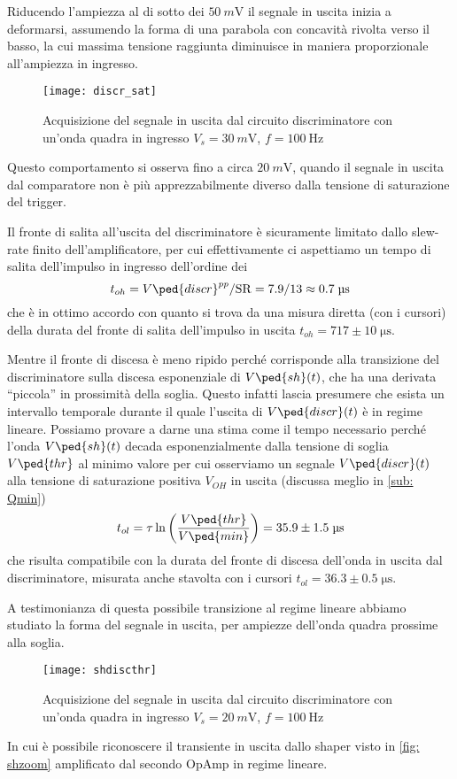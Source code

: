 \documentclass[10pt, a4paper, italian]{article}
\begin{document}
Riducendo l'ampiezza al di sotto dei $\SI{50}{m\V}$ il segnale in uscita
inizia a deformarsi, assumendo la forma di una parabola con concavità rivolta
verso il basso, la cui massima tensione raggiunta diminuisce in maniera
proporzionale all'ampiezza in ingresso.
\begin{figure}[htbp]
	\centering
	\texttt{[image: discr\_sat]}
	\caption{Acquisizione del segnale in uscita dal circuito discriminatore con
	un'onda quadra in ingresso $V_s = \SI{30}{m\V}$, $f = \SI{100}{\Hz}$
	\label{fig: discr_sat}}
\end{figure}

Questo comportamento si osserva fino a circa $\SI{20}{m\V}$, quando il segnale
in uscita dal comparatore non è più apprezzabilmente diverso dalla tensione di
saturazione del trigger.

Il fronte di salita all'uscita del discriminatore è sicuramente limitato dallo
slew-rate finito dell'amplificatore, per cui effettivamente ci aspettiamo
un tempo di salita dell'impulso in ingresso dell'ordine dei
\[
t_{oh} = V\ped{discr}^{pp}/\mathrm{SR} = 7.9 / 13 \approx 0.7 \; \si{\micro\s}
\]
che è in ottimo accordo con quanto si trova da una misura diretta (con i
cursori) della durata del fronte di salita dell'impulso in uscita
$t_{oh} = 717 \pm 10 \; \si{\micro\s}$.

Mentre il fronte di discesa è meno ripido perché corrisponde alla transizione
del discriminatore sulla discesa esponenziale di $V\ped{sh} (t)$, che ha una
derivata ``piccola'' in prossimità della soglia. Questo infatti lascia
presumere che esista un intervallo temporale durante il quale l'uscita di
$V\ped{discr} (t)$ è in regime lineare. Possiamo provare a darne una stima
come il tempo necessario perché l'onda $V\ped{sh} (t)$ decada esponenzialmente
dalla tensione di soglia $V\ped{thr}$ al minimo valore per cui osserviamo un
segnale $V\ped{discr} (t)$ alla tensione di saturazione positiva $V_{OH}$ in
uscita (discussa meglio in \cref{sub: Qmin})
\begin{equation}
t_{ol} = \tau \ln{\left(\frac{V\ped{thr}}{V\ped{min}}\right)} =
35.9 \pm 1.5 \; \si{\micro\s}
\end{equation}
che risulta compatibile con la durata del fronte di discesa dell'onda in
uscita dal discriminatore, misurata anche stavolta con i cursori
$t_{ol} = 36.3 \pm 0.5 \; \si{\micro\s}$.

A testimonianza di questa possibile transizione al regime lineare abbiamo
studiato la forma del segnale in uscita, per ampiezze dell'onda quadra
prossime alla soglia.
\begin{figure}[htbp]
	\centering
	\texttt{[image: shdiscthr]}
	\caption{Acquisizione del segnale in uscita dal circuito discriminatore con
	un'onda quadra in ingresso $V_s = \SI{20}{m\V}$, $f = \SI{100}{\Hz}$
	\label{fig: discrthr}}
\end{figure}
In cui è possibile riconoscere il transiente in uscita dallo shaper visto in
\cref{fig: shzoom} amplificato dal secondo OpAmp in regime lineare.
\end{document}

